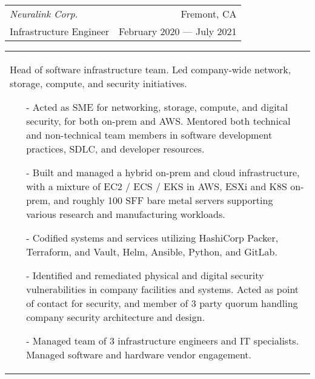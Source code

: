 \begin{tabularx}{\textwidth}{L R}
    \normalsize\textit{Neuralink Corp.} & Fremont, CA \\
    \hspace{10pt}Infrastructure Engineer & February 2020 --- July 2021 \\
\end{tabularx}
\begin{tabularx}{\textwidth}{X}
    \hspace{10pt}Head of software infrastructure team. Led company-wide network, storage, compute, and security initiatives.
    \begin{itemize}
        \itemsep{}
        \item[-] Acted as SME for networking, storage, compute, and digital security, for both on-prem and AWS. Mentored both technical and non-technical team members in software development practices, SDLC, and developer resources.
        \item[-] Built and managed a hybrid on-prem and cloud infrastructure, with a mixture of EC2 / ECS / EKS in AWS, ESXi and K8S on-prem, and roughly 100 SFF bare metal servers supporting various research and manufacturing workloads.
        \item[-] Codified systems and services utilizing HashiCorp Packer, Terraform, and Vault, Helm, Ansible, Python, and GitLab.
        \item[-] Identified and remediated physical and digital security vulnerabilities in company facilities and systems. Acted as point of contact for security, and member of 3 party quorum handling company security architecture and design.
        \item[-] Managed team of 3 infrastructure engineers and IT specialists. Managed software and hardware vendor engagement.
    \end{itemize}
\end{tabularx}

